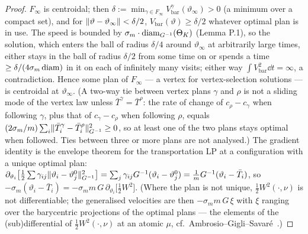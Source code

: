 \begin{proof}
$F_\infty$ is centroidal; then $\delta := \min_{\gamma\in F_\infty}V_{\mathrm{bar}}^\gamma(\vartheta_\infty) > 0$ (a
minimum over a compact set), and for $\lVert \vartheta - \vartheta_\infty\rVert < \delta/2$,
$V_{\mathrm{bar}}(\vartheta) \ge \delta/2$ whatever optimal plan is in use. The speed is bounded by
$\sigma_m\cdot\operatorname{diam}_{G^{-1}}(\Theta_K)$ (Lemma P.1), so the solution, which enters the ball of radius $\delta/4$ around
$\vartheta_\infty$ at arbitrarily large times, either stays in the ball of radius $\delta/2$ from some time on or
spends a time $\ge\delta/(4\sigma_m\operatorname{diam})$ in it on each of infinitely many visits; either way
$\int V_{\mathrm{bar}}^2\dd t = \infty$, a contradiction. Hence some plan of $F_\infty$ --- a vertex for
vertex-selection solutions --- is centroidal at $\vartheta_\infty$. (A two-way tie between vertex plans $\gamma$ and
$\rho$ is not a sliding mode of the vertex law unless $\bar T^\gamma = \bar T^\rho$: the rate of change of
$c_\rho - c_\gamma$ when following $\gamma$, plus that of $c_\gamma - c_\rho$ when following $\rho$, equals
$(2\sigma_m/m)\sum_i\lVert \bar T^\gamma_i - \bar T^\rho_i\rVert^2_{G^{-1}} \ge 0$, so at least one of the two plans stays
optimal when followed. Ties between three or more plans are not analysed.) The gradient identity is the envelope
theorem for the transportation LP at a configuration with a unique optimal plan:
$\partial_{\vartheta_i}\bigl[\tfrac12\sum\gamma_{ij}\lVert \vartheta_i - \vartheta^0_j\rVert^2_{G^{-1}}\bigr]
= \sum_j\gamma_{ij}G^{-1}(\vartheta_i - \vartheta^0_j) = \frac1mG^{-1}(\vartheta_i - \bar T_i)$, so
$-\sigma_m(\vartheta_i - \bar T_i) = -\sigma_m m\,G\,\partial_{\vartheta_i}\bigl[\tfrac12W^2\bigr]$. (Where the plan
is not unique, $\frac12W^2(\cdot,\nu)$ is not differentiable; the generalised velocities are then
$-\sigma_m m\,G\,\xi$ with $\xi$ ranging over the barycentric projections of the optimal plans --- the elements of the
(sub)differential of $\frac12W^2(\cdot,\nu)$ at an atomic $\mu$, cf.\ Ambrosio--Gigli--Savaré~\cite[\S10.4]{ags2008}.)


\end{proof}
